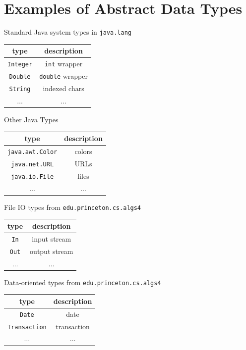 \documentclass[8pt,a4paper,compress]{beamer}
\begin{document}
\section{Examples of Abstract Data Types}
\begin{frame}[fragile]
\pause

Standard Java system types in \lstinline{java.lang}
\begin{center}
\begin{tabular}{cc}
type & description \\ \hline
\lstinline$Integer$ & \lstinline$int$ wrapper \\
\lstinline$Double$ & \lstinline$double$ wrapper \\
\lstinline$String$ & indexed chars \\
$\dots$ & $\dots$
\end{tabular} 
\end{center}

\pause

Other Java Types
\begin{center}
\begin{tabular}{cc}
type & description \\ \hline
\lstinline$java.awt.Color$ & colors \\
\lstinline$java.net.URL$ & URLs \\
\lstinline$java.io.File$ & files \\
$\dots$ & $\dots$
\end{tabular} 
\end{center}

\pause

File IO types from \lstinline{edu.princeton.cs.algs4}
\begin{center}
\begin{tabular}{cc}
type & description \\ \hline
\lstinline$In$  & input stream \\
\lstinline$Out$ & output stream \\
$\dots$ & $\dots$
\end{tabular} 
\end{center}

\pause

Data-oriented types from \lstinline{edu.princeton.cs.algs4}
\begin{center}
\begin{tabular}{cc}
type & description \\ \hline
\lstinline$Date$ & date \\
\lstinline$Transaction$ & transaction \\
$\dots$ & $\dots$
\end{tabular} 
\end{center}
\end{frame}
\end{document}
